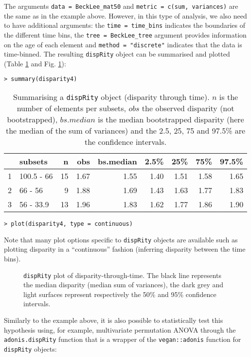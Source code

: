 \documentclass[12pt,letterpaper]{article}
\newcommand{\disp}{\texttt{dispRity} }
\begin{document}
\noindent The arguments \texttt{data = BeckLee\_mat50} and \texttt{metric = c(sum, variances)} are the same as in the example above.
However, in this type of analysis, we also need to have additional arguments: the \texttt{time = time\_bins} indicates the boundaries of the different time bins, the \texttt{tree = BeckLee\_tree} argument provides information on the age of each element and \texttt{method = "discrete"} indicates that the data is time-binned.
The resulting \disp object can be summarised and plotted (Table \ref{Tab:summary_time} and Fig. \ref{Fig:plot_time}):

\noindent \texttt{> summary(disparity4)}

\begin{table}[ht]
\centering
\begin{tabular}{rlrrrrrrr}
  \hline
 & subsets & n & obs & bs.median & 2.5\% & 25\% & 75\% & 97.5\% \\ 
  \hline
1 & 100.5 - 66 &  15 & 1.67 & 1.55 & 1.40 & 1.51 & 1.58 & 1.65 \\ 
  2 & 66 - 56 &   9 & 1.88 & 1.69 & 1.43 & 1.63 & 1.77 & 1.83 \\ 
  3 & 56 - 33.9 &  13 & 1.96 & 1.83 & 1.62 & 1.77 & 1.86 & 1.90 \\ 
   \hline
\end{tabular}
\caption{Summarising a \disp object (disparity through time). $n$ is the number of elements per subsets, $obs$ the observed disparity (not bootstrapped), $bs.median$ is the median bootstrapped disparity (here the median of the sum of variances) and the 2.5, 25, 75 and 97.5\% are the confidence intervals.}
\label{Tab:summary_time}
\end{table}

\noindent \texttt{> plot(disparity4, type = \textquotedbl continuous\textquotedbl)}

\noindent Note that many plot options specific to \disp objects are available such as plotting disparity in a ``continuous'' fashion (inferring disparity between the time bins).

\begin{figure}[!htbp]
\centering
\caption{\disp plot of disparity-through-time. The black line represents the median disparity (median sum of variances), the dark grey and light surfaces represent respectively the 50\% and 95\% confidence intervals.}
\label{Fig:plot_time}
\end{figure}

Similarly to the example above, it is also possible to statistically test this hypothesis using, for example, multivariate permutation ANOVA  \citep[PERMANOVA; ][]{NPMANOVA} through the \texttt{adonis.dispRity} function that is a wrapper of the \texttt{vegan::adonis} function  \citep{oksanen2007vegan} for \texttt{dispRity} objects:
\end{document}
